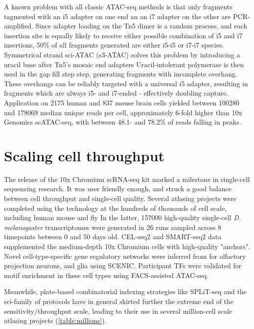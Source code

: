 A known problem with all classic ATAC-seq methods is that only fragments tagmented with an i5 adapter on one end an an i7 adapter on the other are PCR-amplified. Since adapter loading on the Tn5 dimer is a random process, and each insertion site is equally likely to receive either possible combination of i5 and i7 insertions, 50\% of all fragments generated are either i5-i5 or i7-i7 species. Symmetrical strand sci-ATAC (s3-ATAC) solves this problem by introducing a uracil base after Tn5's mosaic end adapters Uracil-intolerant polymerase is then used in the gap fill step step, generating fragments with incomplete overhang. These overhangs can be reliably targeted with a universal i5 adapter, resulting in fragments which are always i5- and i7-ended - effectively doubling capture.
Application on \num{2175} human and \num{837} mouse brain cells yielded between \num{100280} and \num{178069} median unique reads per cell, approximately 6-fold higher than 10x Genomics scATAC-seq, with between 48.1- and 78.2\% of reads falling in peaks.

\section{Scaling cell throughput}
The release of the 10x Chromium scRNA-seq kit marked a milestone in single-cell sequencing research. It was user friendly enough, and struck a good balance between cell throughput and single-cell quality. Several atlasing projects were completed using the technology at the hundreds of thousands of cell scale, including human mouse and fly In the latter, \num{157000} high-quality single-cell \textit{D. melanogaster} transcriptomes were generated in 26 runs sampled across 8 timepoints between 0 and 50 days old. CEL-seq2 and SMART-seq2 data supplemented the medium-depth 10x Chromium cells with high-quality "anchors". Novel cell-type-specific gene regulatory networks were inferred from for olfactory projection neurons, and glia using SCENIC. Participant TFs were validated for motif enrichment in these cell types using FACS-assisted ATAC-seq.

Meanwhile, plate-based combinatorial indexing strategies like SPLiT-seq and the sci-family of protocols have in general skirted further the extreme end of the sensitivity/throughput scale, leading to their use in several million-cell scale atlasing projects (\autoref{table:millions}).

